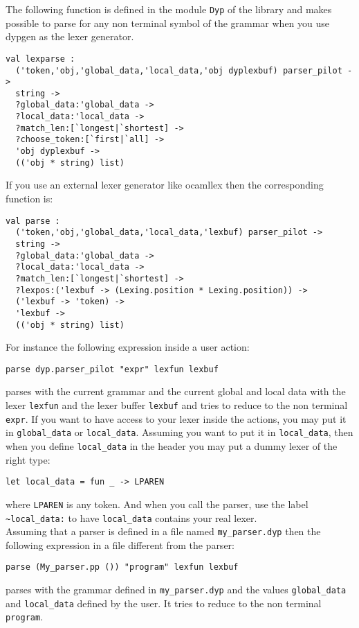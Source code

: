 \documentclass[12pt]{article}
\begin{document}
{The following function is defined in the module \verb|Dyp| of the library and makes possible to parse for any non terminal symbol of the grammar when you use dypgen as the lexer generator.
\begin{verbatim}
val lexparse :
  ('token,'obj,'global_data,'local_data,'obj dyplexbuf) parser_pilot ->
  string ->
  ?global_data:'global_data ->
  ?local_data:'local_data ->
  ?match_len:[`longest|`shortest] ->
  ?choose_token:[`first|`all] ->
  'obj dyplexbuf ->
  (('obj * string) list)
\end{verbatim}
If you use an external lexer generator like ocamllex then the corresponding function is:
\begin{verbatim}
val parse :
  ('token,'obj,'global_data,'local_data,'lexbuf) parser_pilot ->
  string ->
  ?global_data:'global_data ->
  ?local_data:'local_data ->
  ?match_len:[`longest|`shortest] ->
  ?lexpos:('lexbuf -> (Lexing.position * Lexing.position)) ->
  ('lexbuf -> 'token) ->
  'lexbuf ->
  (('obj * string) list)
\end{verbatim}
For instance the following expression inside a user action:
\begin{verbatim}
parse dyp.parser_pilot "expr" lexfun lexbuf
\end{verbatim}
parses with the current grammar and the current global and local data with the lexer \verb|lexfun| and the lexer buffer \verb|lexbuf| and tries to reduce to the non terminal \verb|expr|. If you want to have access to your lexer inside the actions, you may put it in \verb|global_data| or \verb|local_data|. Assuming you want to put it in \verb|local_data|, then when you define  \verb|local_data| in the header you may put a dummy lexer of the right type:
\begin{verbatim}
let local_data = fun _ -> LPAREN
\end{verbatim}
where \verb|LPAREN| is any token. And when you call the parser, use the label \verb|~local_data:| to have \verb|local_data| contains your real lexer.\\

Assuming that a parser is defined in a file named \verb|my_parser.dyp| then the following expression in a file different from the parser:
\begin{verbatim}
parse (My_parser.pp ()) "program" lexfun lexbuf
\end{verbatim}
parses with the grammar defined in \verb|my_parser.dyp| and the values \verb|global_data| and \verb|local_data| defined by the user. It tries to reduce to the non terminal \verb|program|.\\

}
\end{document}
